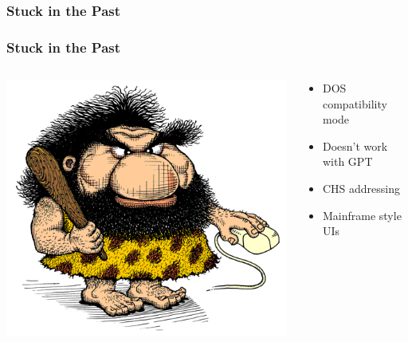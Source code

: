 \subsubsection{Stuck in the Past}
\begin{frame}\frametitle{Stuck in the Past}
  \begin{columns}
    \begin{column}{.5\linewidth}
      \includegraphics[scale=0.3]{img/linkman}
       \end{column}
    \begin{column}{.5\linewidth}
      \begin{itemize}
      \item DOS compatibility mode
      \item Doesn't work with GPT
      \item CHS addressing
      \item Mainframe style UIs\newline
      \end{itemize}
    \end{column}
  \end{columns}
\end{frame}

